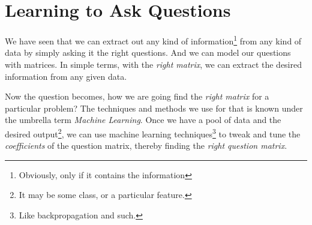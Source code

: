 \documentclass[../../main]{subfiles}
\begin{document}
\section{Learning to Ask Questions} \label{sec:}

We have seen that we can extract out any kind of information\footnote{Obviously, only if it
contains the information} from any kind of data by simply asking it the right questions.
And we can model our questions with matrices. In simple terms, with the \emph{right matrix},
we can extract the desired information from any given data.

Now the question becomes, how we are going find the \emph{right matrix} for a particular problem?
The techniques and methods we use for that is known under the umbrella term \emph{Machine Learning}. Once we
have a pool of data and the desired output\footnote{It may be some class, or a particular feature.},
we can use machine learning techniques\footnote{Like backpropagation and such.} to tweak and tune
the \emph{coefficients} of the question matrix, thereby finding the \emph{right question matrix}.
\end{document}

